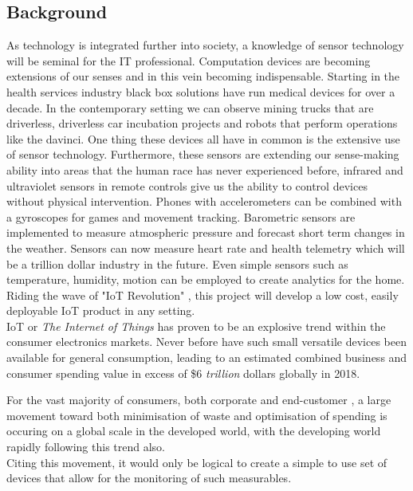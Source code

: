 \documentclass{article}
\begin{document}
        \subsection{Background}
            As technology is integrated further into society, a knowledge of sensor technology will be 
            seminal for the IT professional. Computation devices are becoming extensions of our senses and 
            in this vein becoming indispensable. Starting in the health services industry black box solutions 
            have run medical devices for over a decade. In the contemporary setting we can observe mining trucks 
            that are driverless, driverless car incubation projects and robots that perform operations 
            like the davinci\cite{ForbesBernardmarr}\cite{ForbesAndrewwarnold}.
            \vspace{5mm}
            One thing these devices all have in common is the extensive use of sensor technology. 
            Furthermore, these sensors are extending our sense-making ability into areas that the 
            human race has never experienced before, infrared and ultraviolet sensors in remote 
            controls give us the ability to control devices without physical intervention. Phones 
            with accelerometers can be combined with a gyroscopes for games and movement tracking. 
            Barometric sensors are implemented to measure atmospheric pressure and forecast short 
            term changes in the weather. Sensors can now measure heart rate and health telemetry 
            which will be a trillion dollar industry in the future. Even simple sensors such as 
            temperature, humidity, motion can be employed to create analytics for the home. 
            \vspace{5mm}
            Riding the wave of "IoT Revolution" \cite{Forbes}, this project will develop
            a low cost, easily deployable IoT product in any setting.
            \\
            IoT or \textit{The Internet of Things} has proven to be an explosive trend within
            the consumer electronics markets. Never before have such small versatile devices been
            available for general consumption, leading to an estimated combined business and
            consumer spending value in excess of \$6 \textit{trillion} dollars globally in 2018\cite{Forbes}.
            \par\noindent
            For the vast majority of consumers, both corporate and end-customer \cite{Mckinsey}, a large 
            movement toward both minimisation of waste and optimisation of spending is occuring
            on a global scale in the developed world, with the developing world rapidly following 
            this trend also\cite{SunNews}.
            \\
            Citing this movement, it would only be logical to create a simple to use set of devices 
            that allow for the monitoring of such measurables.
        \vspace{5mm}
\end{document}
